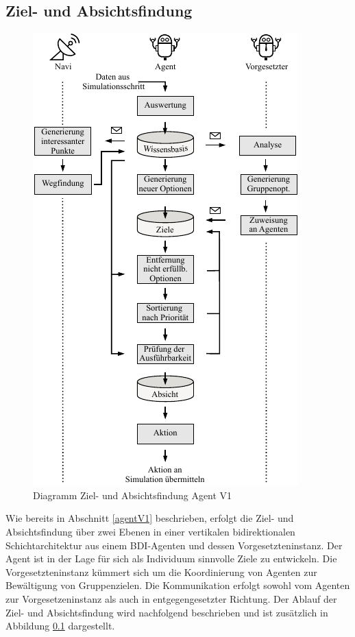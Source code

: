 \documentclass[runningheads]{llncs}
\begin{document}
\subsection{Ziel- und Absichtsfindung}\label{absichtsfindung}
\begin{figure}[t]
\centering
\includegraphics[scale=1]{./Referenzen/Entscheidungsfindung.pdf}
\caption{Diagramm Ziel- und Absichtsfindung Agent V1}
\label{desires}
\end{figure}
Wie bereits in Abschnitt \ref{agentV1} beschrieben, erfolgt die Ziel- und Absichtsfindung über zwei Ebenen in einer vertikalen bidirektionalen Schichtarchitektur aus einem BDI-Agenten und dessen Vorgesetzteninstanz. Der Agent ist in der Lage für sich als Individuum sinnvolle Ziele zu entwickeln. Die Vorgesetzteninstanz kümmert sich um die Koordinierung von Agenten zur Bewältigung von Gruppenzielen. Die Kommunikation erfolgt sowohl vom Agenten zur Vorgesetzeninstanz als auch in entgegengesetzter Richtung. Der Ablauf der Ziel- und Absichtsfindung wird nachfolgend beschrieben und ist zusätzlich in Abbildung \ref{absichtsfindung} dargestellt.
\end{document}
